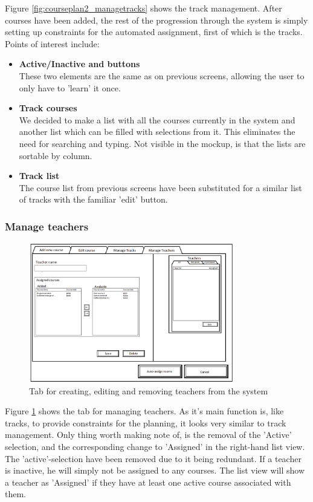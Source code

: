 Figure \ref{fig:courseplan2_managetracks} shows the track management. After courses have been added, the rest of the progression through the system is simply setting up constraints for the automated assignment, first of which is the tracks. 
Points of interest include:
\begin{itemize}
\item \textbf{Active/Inactive and buttons} \\
These two elements are the same as on previous screens, allowing the user to only have to 'learn' it once.
\item \textbf{Track courses} \\
We decided to make a list with all the courses currently in the system and another list which can be filled with selections from it. This eliminates the need for searching and typing. Not visible in the mockup, is that the lists are sortable by column.
\item \textbf{Track list} \\
The course list from previous screens have been substituted for a similar list of tracks with the familiar 'edit' button.
\end{itemize}

\subsubsection{Manage teachers}
\begin{figure}[htb]
\begin{center}
\leavevmode
\includegraphics[width=0.8\textwidth]{images/courseplan2_manageteachers}
\end{center}
\caption{Tab for creating, editing and removing teachers from the system}
\label{fig:courseplan2_manageteachers}
\end{figure}

Figure \ref{fig:courseplan2_manageteachers} shows the tab for managing teachers. As it's main function is, like tracks, to provide constraints for the planning, it looks very similar to track management.
Only thing worth making note of, is the removal of the 'Active' selection, and the corresponding change to 'Assigned' in the right-hand list view. The 'active'-selection have been removed due to it being redundant. If a teacher is inactive, he will simply not be assigned to any courses. The list view will show a teacher as 'Assigned' if they have at least one active course associated with them.

